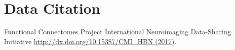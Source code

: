 \section{Data Citation} \label{DataCitation}
Functional Connectomes Project International Neuroimaging Data-Sharing Initiative \url{http://dx.doi.org/10.15387/CMI_HBN (2017)}.
